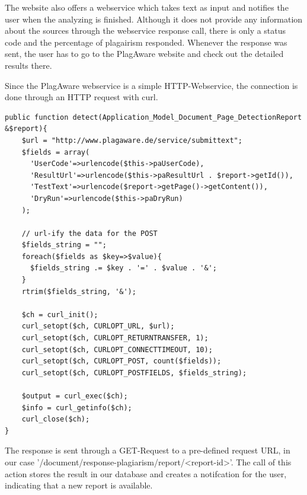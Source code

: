 The website also offers a webservice which takes text as input and notifies the user when the analyzing is finished. Although it does not provide any information about the sources through the webservice response call, there is only a status code and the percentage of plagairism responded. Whenever the response was sent, the user has to go to the PlagAware website and check out the detailed results there.

Since the PlagAware webservice is a simple HTTP-Webservice, the connection is done through an HTTP request with curl.
\begin{lstlisting}[caption=Sending a request through curl to the PlagAware webservice]
public function detect(Application_Model_Document_Page_DetectionReport &$report){
    $url = "http://www.plagaware.de/service/submittext";
    $fields = array(
      'UserCode'=>urlencode($this->paUserCode),
      'ResultUrl'=>urlencode($this->paResultUrl . $report->getId()),
      'TestText'=>urlencode($report->getPage()->getContent()),
      'DryRun'=>urlencode($this->paDryRun)
    );

    // url-ify the data for the POST
    $fields_string = "";
    foreach($fields as $key=>$value){
      $fields_string .= $key . '=' . $value . '&';
    }
    rtrim($fields_string, '&');

    $ch = curl_init();
    curl_setopt($ch, CURLOPT_URL, $url);
    curl_setopt($ch, CURLOPT_RETURNTRANSFER, 1);
    curl_setopt($ch, CURLOPT_CONNECTTIMEOUT, 10);
    curl_setopt($ch, CURLOPT_POST, count($fields));
    curl_setopt($ch, CURLOPT_POSTFIELDS, $fields_string);

    $output = curl_exec($ch);
    $info = curl_getinfo($ch);
    curl_close($ch);
}
\end{lstlisting}

The response is sent through a GET-Request to a pre-defined request URL, in our case '/document/response-plagiarism/report/<report-id>'. The call of this action stores the result in our database and creates a notifcation for the user, indicating that a new report is available.